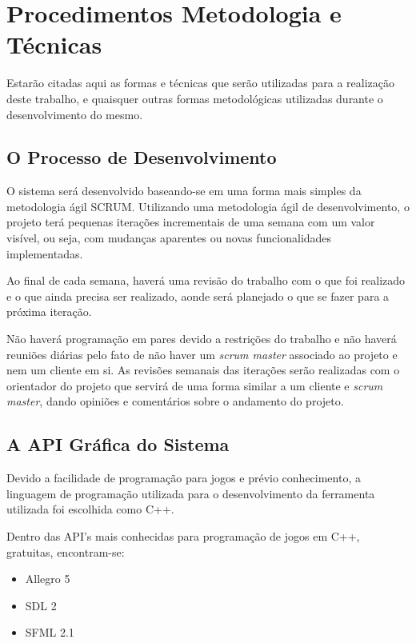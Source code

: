 \chapter[Procedimentos Metodológicos e Técnicas]{Procedimentos Metodologia e Técnicas}

Estarão citadas aqui as formas e técnicas que serão utilizadas para a realização deste trabalho, e quaisquer outras formas metodológicas utilizadas durante o desenvolvimento do mesmo. 

\section{O Processo de Desenvolvimento}

O sistema será desenvolvido baseando-se em uma forma mais simples da metodologia ágil SCRUM. Utilizando uma metodologia ágil de desenvolvimento, o projeto terá pequenas iterações incrementais de uma semana com um valor visível, ou seja, com mudanças aparentes ou novas funcionalidades implementadas. 

Ao final de cada semana, haverá uma revisão do trabalho com o que foi realizado e o que ainda precisa ser realizado, aonde será planejado o que se fazer para a próxima iteração. 

Não haverá programação em pares devido a restrições do trabalho e não haverá reuniões diárias pelo fato de não haver um \textit{scrum master} associado ao projeto e nem um cliente em si. As revisões semanais das iterações serão realizadas com o orientador do projeto que servirá de uma forma similar a um cliente e \textit{scrum master}, dando opiniões e comentários sobre o andamento do projeto.

\section{A API Gráfica do Sistema}

Devido a facilidade de programação para jogos e prévio conhecimento, a linguagem de programação utilizada para o desenvolvimento da ferramenta utilizada foi escolhida como C++. 

Dentro das API's mais conhecidas para programação de jogos em C++, gratuitas, encontram-se: 
\begin{itemize}
	\item Allegro 5 
	\item SDL 2
	\item SFML 2.1
\end{itemize}

